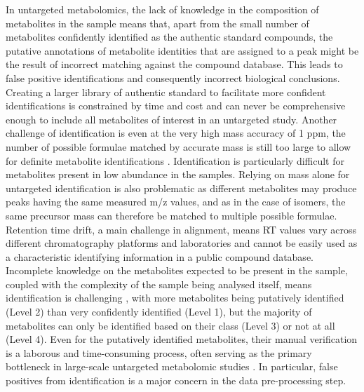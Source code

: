 In untargeted metabolomics, the lack of knowledge in the composition of metabolites in the sample means that, apart from the small number of metabolites confidently identified as the authentic standard compounds, the putative annotations of metabolite identities that are assigned to a peak might be the result of incorrect matching against the compound database. This leads to false positive identifications and consequently incorrect biological conclusions. Creating a larger library of authentic standard to facilitate more confident identifications is constrained by time and cost and can never be comprehensive enough to include all metabolites of interest in an untargeted study. Another challenge of identification is even at the very high mass accuracy of 1 ppm, the number of possible formulae matched by accurate mass is still too large to allow for definite metabolite identifications \cite{Kind2006}. Identification is particularly difficult for metabolites present in low abundance in the samples. Relying on mass alone for untargeted identification is also problematic as different metabolites may produce peaks having the same measured m/z values, and as in the case of isomers, the same precursor mass can therefore be matched to multiple possible formulae. Retention time drift, a main challenge in alignment, means RT values vary across different chromatography platforms and laboratories and cannot be easily used as a characteristic identifying information in a public compound database. Incomplete knowledge on the metabolites expected to be present in the sample, coupled with the complexity of the sample being analysed itself, means identification is challenging \cite{Dunn2012}, with more metabolites being putatively identified (Level 2) than very confidently identified (Level 1), but the majority of metabolites can only be identified based on their class (Level 3) or not at all (Level 4). Even for the putatively identified metabolites, their manual verification is a laborous and time-consuming process, often serving as the primary bottleneck in large-scale untargeted metabolomic studies \cite{Dunn2012, DaSilva2015}. In particular, false positives from identification is a major concern in the data pre-processing step.

